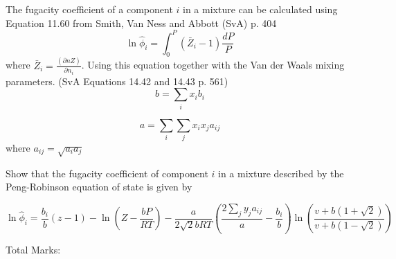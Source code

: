 \documentclass[12pt, A4paper]{article}
\newcounter{parameters}
\begin{document}
The fugacity coefficient of a component $i$ in a mixture can be calculated using Equation 11.60 from Smith, Van Ness and Abbott (SvA) p. 404
$$
\ln{\hat{\phi}_i} = \int^P_0 (\bar{Z}_i - 1) \frac{d P}{P}
$$
where $\bar{Z}_i  = \frac{\left( \partial n Z \right)}{\partial n_i}$. Using this equation together with the Van der Waals mixing parameters. (SvA Equations 14.42 and 14.43 p. 561)
$$
b = \sum_{i} x_i b_i
$$

$$
a = \sum_{i}\sum_{j} x_i x_j a_{ij}
$$
 where $a_{ij} = \sqrt{a_i a_j}$
 



 Show that the fugacity coefficient of component $i$ in a mixture described by the Peng-Robinson equation of state is given by
 
$$
\ln{\hat{\phi}_i} = \frac{b_i}{b} (z - 1) - \ln{\left( Z - \frac{b P}{RT} \right) - \frac{a}{2 \sqrt{2} b R T} \left(\frac{2 \sum_{j} y_j a_{ij}}{a} - \frac{b_i}{b} \right) \ln{\left( \frac{ v + b \left( 1 + \sqrt{2}\right) }{v + b \left( 1 - \sqrt{2}\right) }\right)}}
$$ 

 
\begin{centering}
Total Marks: \\
\end{centering}


%

\end{document}
